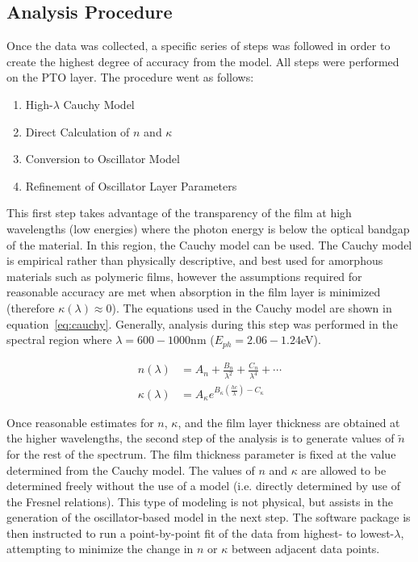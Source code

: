
\subsection{Analysis Procedure}

Once the data was collected, a specific series of steps was followed in order to create the highest degree of accuracy from the model. All steps were performed on the PTO layer. The procedure went as follows:

\begin{enumerate}
\item
High-$\lambda$ Cauchy Model
\item
Direct Calculation of $n$ and $\kappa$
\item
Conversion to Oscillator Model
\item
Refinement of Oscillator Layer Parameters
\end{enumerate}

This first step takes advantage of the transparency of the film at high wavelengths (low energies) where the photon energy is below the optical bandgap of the material. In this region, the Cauchy model can be used. The Cauchy model is empirical rather than physically descriptive, and best used for amorphous materials such as polymeric films, however the assumptions required for reasonable accuracy are met when absorption in the film layer is minimized (therefore $\kappa(\lambda)\approx0$). The equations used in the Cauchy model are shown in equation~\ref{eq:cauchy}. Generally, analysis during this step was performed in the spectral region where $\lambda = 600-1000$nm ($E_{ph} = 2.06-1.24$eV). 

\begin{subequations}
\label{eq:cauchy}
\begin{align}
	n\left(\lambda\right) &= A_{n} + \frac{B_{n}}{\lambda^{2}}+\frac{C_{n}}{\lambda^{4}}+\cdots\\
        	\kappa\left(\lambda\right) &= A_{\kappa}e^{B_{\kappa}\left(\frac{hc}{\lambda}\right)-C_{\kappa}}
\end{align}
\end{subequations}

Once reasonable estimates for $n$, $\kappa$, and the film layer thickness are obtained at the higher wavelengths, the second step of the analysis is to generate values of $\tilde{n}$ for the rest of the spectrum. The film thickness parameter is fixed at the value determined from the Cauchy model. The values of $n$ and $\kappa$ are allowed to be determined freely without the use of a model (i.e. directly determined by use of the Fresnel relations). This type of modeling is not physical, but assists in the generation of the oscillator-based model in the next step. The software package is then instructed to run a point-by-point fit of the data from highest- to lowest-$\lambda$, attempting to minimize the change in $n$ or $\kappa$ between adjacent data points. 

